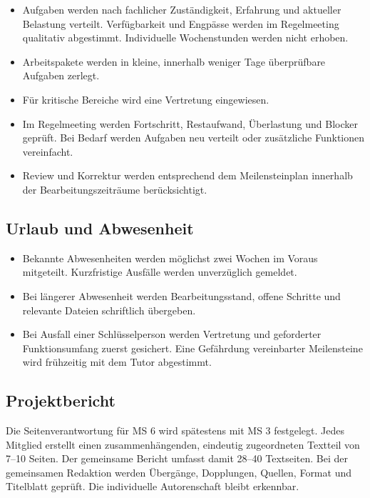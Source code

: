 \documentclass[11pt,a4paper]{article}
\begin{document}
\begin{itemize}
\item Aufgaben werden nach fachlicher Zuständigkeit, Erfahrung und aktueller Belastung verteilt. Verfügbarkeit und Engpässe werden im Regelmeeting qualitativ abgestimmt. Individuelle Wochenstunden werden nicht erhoben.
\item Arbeitspakete werden in kleine, innerhalb weniger Tage überprüfbare Aufgaben zerlegt.
\item Für kritische Bereiche wird eine Vertretung eingewiesen.
\item Im Regelmeeting werden Fortschritt, Restaufwand, Überlastung und Blocker geprüft. Bei Bedarf werden Aufgaben neu verteilt oder zusätzliche Funktionen vereinfacht.
\item Review und Korrektur werden entsprechend dem Meilensteinplan innerhalb der Bearbeitungszeiträume berücksichtigt.
\end{itemize}

\subsection{Urlaub und Abwesenheit}

\begin{itemize}
\item Bekannte Abwesenheiten werden möglichst zwei Wochen im Voraus mitgeteilt. Kurzfristige Ausfälle werden unverzüglich gemeldet.
\item Bei längerer Abwesenheit werden Bearbeitungsstand, offene Schritte und relevante Dateien schriftlich übergeben.
\item Bei Ausfall einer Schlüsselperson werden Vertretung und geforderter Funktionsumfang zuerst gesichert. Eine Gefährdung vereinbarter Meilensteine wird frühzeitig mit dem Tutor abgestimmt.
\end{itemize}

\subsection{Projektbericht}

Die Seitenverantwortung für MS 6 wird spätestens mit MS 3 festgelegt. Jedes Mitglied erstellt einen zusammenhängenden, eindeutig zugeordneten Textteil von 7–10 Seiten. Der gemeinsame Bericht umfasst damit 28–40 Textseiten. Bei der gemeinsamen Redaktion werden Übergänge, Dopplungen, Quellen, Format und Titelblatt geprüft. Die individuelle Autorenschaft bleibt erkennbar.
\end{document}
